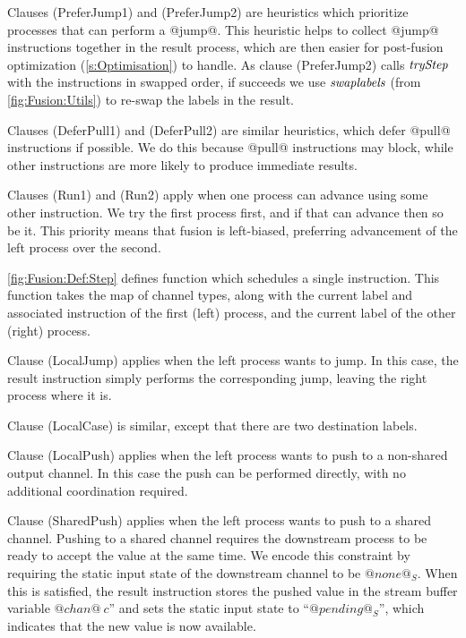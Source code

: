 Clauses (PreferJump1) and (PreferJump2) are heuristics which prioritize processes that can perform a @jump@. This heuristic helps to collect @jump@ instructions together in the result process, which are then easier for post-fusion optimization (\autoref{s:Optimisation}) to handle. As clause (PreferJump2) calls $\textit{tryStep}$ with the instructions in swapped order, if  succeeds we use $\textit{swaplabels}$ (from \autoref{fig:Fusion:Utils}) to re-swap the labels in the result.

Clauses (DeferPull1) and (DeferPull2) are similar heuristics, which defer @pull@ instructions if possible. We do this because @pull@ instructions may block, while other instructions are more likely to produce immediate results.

Clauses (Run1) and (Run2) apply when one process can advance using some other instruction. We try the first process first, and if that can advance then so be it. This priority means that fusion is left-biased, preferring advancement of the left process over the second.




\smallskip
\autoref{fig:Fusion:Def:Step} defines function  which schedules a single instruction. This function takes the map of channel types, along with the current label and associated instruction of the first (left) process, and the current label of the other (right) process.

Clause (LocalJump) applies when the left process wants to jump.
In this case, the result instruction simply performs the corresponding jump, leaving the right process where it is. 

Clause (LocalCase) is similar, except that there are two destination labels.

Clause (LocalPush) applies when the left process wants to push to a non-shared output channel.
In this case the push can be performed directly, with no additional coordination required.

Clause (SharedPush) applies when the left process wants to push to a shared channel. Pushing to a shared channel requires the downstream process to be ready to accept the value at the same time. We encode this constraint by requiring the static input state of the downstream channel to be $@none@_S$. When this is satisfied, the result instruction stores the pushed value in the stream buffer variable $@chan@~c$'' and sets the static input state to ``$@pending@_S$'', which indicates that the new value is now available. 


